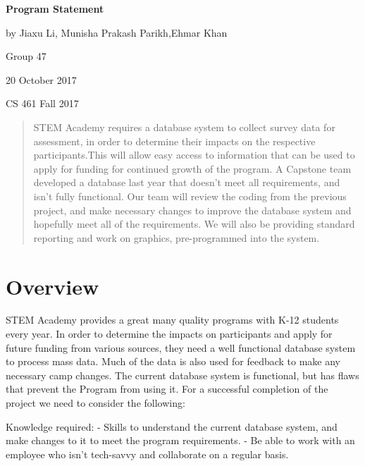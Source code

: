 \documentclass[onecolumn, draftclsnofoot,10pt, compsoc]{IEEEtran}
\begin{document}
\begin{titlepage}
		
		\begin{center}
		\bigbreak	
		\textbf{Program Statement}
	
  	by Jiaxu Li, Munisha Prakash Parikh,Ehmar Khan

  	  Group 47

  	  20 October 2017
   
		 CS 461 Fall 2017
    
   		\end{center}
        \begin{abstract}
        STEM Academy requires a database system to collect survey data for assessment, in order to determine their impacts on the respective participants.This will allow easy access to information that can be used to apply for funding for continued growth of the program. A Capstone team developed a database last year that doesn't meet all requirements, and isn't fully functional. Our team will review the coding from the previous project, and make necessary changes to improve the database system and hopefully meet all of the requirements. We will also be providing standard reporting and work on graphics, pre-programmed into the system.
        \end{abstract}     
\end{titlepage}
\newpage
{}
\tableofcontents
\clearpage

\section{Overview}
STEM Academy provides a great many quality programs with K-12 students every year. In order to determine the impacts on participants and apply for future funding from various sources, they need a well functional database system to process mass data. Much of the data is also used for feedback to make any necessary camp changes. The current database system is functional, but has flaws that prevent the Program from using it. For a successful completion of the project we need to consider the following:
\newline \newline

Knowledge required: \newline
- Skills to understand the current database system, and make changes to it to meet the program requirements. \newline
- Be able to work with an employee who isn\rq t tech-savvy and collaborate on a regular basis.\newline\newline
\end{document}
